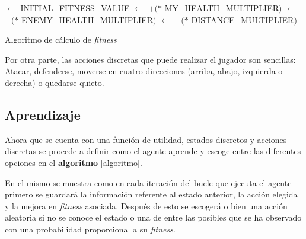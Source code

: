 \begin{algorithm}
	
	
	
	\Input{\PlayerHealth, \EnemyHealth, \Distance, \LookingAtEnemy, \NoWallsNear}
	\Output{\Fitness}
		
		
		\Fitness$\leftarrow$ INITIAL\_FITNESS\_VALUE\;
		\Fitness$\leftarrow$ \Fitness$+ ($\PlayerHealth$*$ MY\_HEALTH\_MULTIPLIER$)$\;
		\Fitness$\leftarrow$ \Fitness$- ($\EnemyHealth$*$ ENEMY\_HEALTH\_MULTIPLIER$)$\;
		\Fitness$\leftarrow$ \Fitness$- ($\Distance$*$ DISTANCE\_MULTIPLIER$)$\;
		
	

	\caption{Algoritmo de cálculo de \textit{fitness}}
	\label{algoritmo:fitness}
\end{algorithm}

\bigskip


\bigskip

Por otra parte, las acciones discretas que puede realizar el jugador son sencillas: Atacar, defenderse, moverse en cuatro direcciones (arriba, abajo, izquierda o derecha) o quedarse quieto.


\subsection{Aprendizaje}

Ahora que se cuenta con una función de utilidad, estados discretos y acciones discretas se procede a definir como el agente aprende y escoge entre las diferentes opciones en el \textbf{algoritmo} \ref{algoritmo}.

\bigskip


En el mismo se muestra como en cada iteración del bucle que ejecuta el agente primero se guardará la información referente al estado anterior, la acción elegida y la mejora en \textit{fitness} asociada. Después de esto se escogerá o bien una acción aleatoria si no se conoce el estado o una de entre las posibles que se ha observado con una probabilidad proporcional a su \textit{fitness}.

